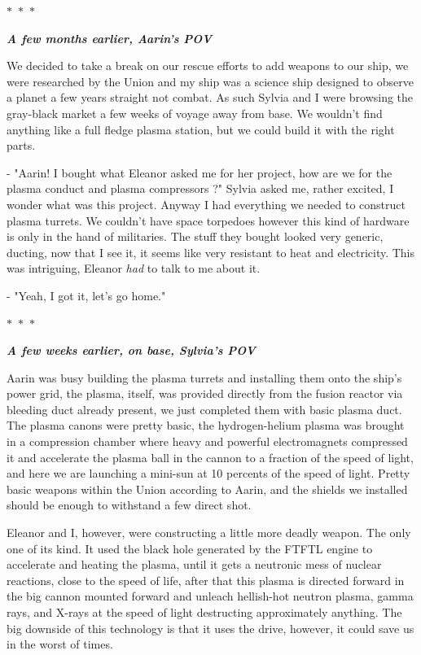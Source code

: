 \documentclass[colorlinks,12pt,a4paper]{book}
\newcommand\sep{\begin{center}
  \boldmath $\ast$~$\ast$~$\ast$
\end{center}}
\begin{document}
\sep 

\textit{\textbf{A few months earlier, Aarin's POV}}\par 
\bigskip

We decided to take a break on our rescue efforts to add weapons to our ship, we were researched by the Union and my ship was a 
science ship designed to observe a planet a few years straight not combat. As such Sylvia and I were browsing the gray-black market 
a few weeks of voyage away from base. We wouldn't find anything like a full fledge plasma station, but we could build it with the right 
parts.\par 
\bigskip

- "Aarin! I bought what Eleanor asked me for her project, how are we for the plasma conduct and plasma compressors ?" Sylvia asked me,
rather excited, I wonder what was this project. Anyway I had everything we needed to construct plasma turrets. We couldn't have 
space torpedoes however this kind of hardware is only in the hand of militaries. The stuff they bought looked very generic, ducting,
now that I see it, it seems like very resistant to heat and electricity. This was intriguing, Eleanor \textit{had} to talk to me about 
it.\par 
\bigskip

- "Yeah, I got it, let's go home."
\sep 

\textit{\textbf{A few weeks earlier, on base, Sylvia's POV}}\par 
\bigskip

Aarin was busy building the plasma turrets and installing them onto the ship's power grid, the plasma, itself, was provided directly 
from the fusion reactor via bleeding duct already present, we just completed them with basic plasma duct. The plasma canons were pretty 
basic, the hydrogen-helium plasma was brought in a compression chamber where heavy and powerful electromagnets compressed it and accelerate the plasma 
ball in the cannon to a fraction of the speed of light, and here we are launching a mini-sun at 10 percents of the speed of light. Pretty 
basic weapons within the Union according to Aarin, and the shields we installed should be enough to withstand a few direct shot.\par 
\bigskip

Eleanor and I, however, were constructing a little more deadly weapon. The only one of its kind. It used the black hole generated by the 
FTFTL engine to accelerate and heating the plasma, until it gets a neutronic mess of nuclear reactions, close to the speed of life, 
after that this plasma is directed forward in the big cannon mounted forward and unleach hellish-hot neutron plasma, gamma rays,
and X-rays at the speed of light destructing approximately anything. The big downside of this technology is that it uses the drive,
however, it could save us in the worst of times.\bigskip
\end{document}
